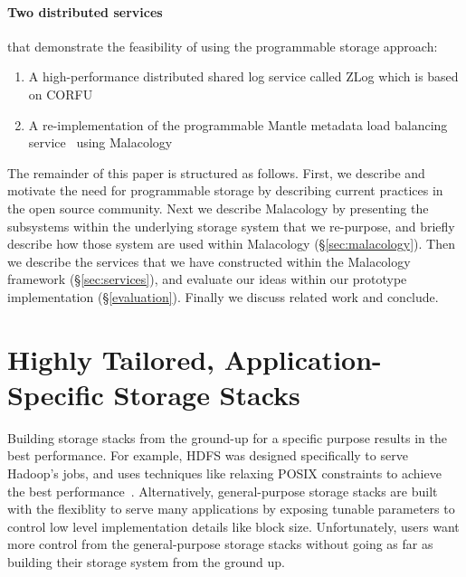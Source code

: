 \documentclass[preprint]{sigplanconf-eurosys}
\begin{document}
\paragraph*{Two distributed services} that demonstrate the feasibility of using
the programmable storage approach:

\begin{enumerate}

\item A high-performance distributed shared log service called ZLog which is
based on CORFU~\cite{balakrishnan_corfu_2012}

\item A re-implementation of the programmable Mantle metadata load balancing
service~\cite{sevilla:sc15-mantle} using Malacology

\end{enumerate}

The remainder of this paper is structured as follows. First, we describe and
motivate the need for programmable storage by describing current practices in
the open source community. Next we describe Malacology by presenting the
subsystems within the underlying storage system that we re-purpose, and briefly
describe how those system are used within Malacology (\S\ref{sec:malacology}).
Then we describe the services that we have constructed within the Malacology
framework (\S\ref{sec:services}), and evaluate our ideas within our prototype
implementation (\S\ref{evaluation}).  Finally we discuss related work and
conclude.

\section{Highly Tailored, Application-Specific Storage Stacks
}\label{highly-tailored-and-application-specifc-storage-systems}

Building storage stacks from the ground-up for a specific purpose results in
the best performance. For example, HDFS was designed specifically to serve
Hadoop's jobs, and uses techniques like relaxing POSIX constraints to achieve
the best performance~\cite{CITEME}. Alternatively, general-purpose storage
stacks are built with the flexiblity to serve many applications by exposing
tunable parameters to control low level implementation details like block size.
Unfortunately, users want more control from the general-purpose storage stacks
without going as far as building their storage system from the ground up.

\end{document}
